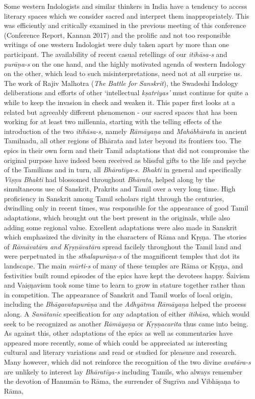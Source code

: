 Some western Indologists and similar thinkers in India have a tendency to access literary spaces which we consider sacred and interpret them inappropriately. This was efficiently and critically examined in the previous meeting of this conference (Conference Report, Kannan 2017) and the prolific and not too responsible writings of one western Indologist were duly taken apart by more than one participant. The availability of recent casual retellings of our \textit{itihāsa-s} and \textit{purāņa-s} on the one hand, and the highly motivated agenda of western Indology on the other, which lead to such misinterpretations, need not at all surprise us. The work of Rajiv Malhotra (\textit{The Battle for Sanskrit}), the Swadeshi Indology deliberations and efforts of other ‘intellectual \textit{kṣatriyas’} must continue for quite a while to keep the invasion in check and weaken it. This paper first looks at a related but agreeably different phenomenon - our sacred spaces that has been working for at least two millennia, starting with the telling effects of the introduction of the two \textit{itihāsa-s,} namely \textit{Rāmāyaṇa} and \textit{Mahābhārata} in ancient Tamilnadu, all other regions of Bhārata and later beyond its frontiers too. The epics in their own form and their Tamil adaptations that did not compromise the original purpose have indeed been received as blissful gifts to the life and psyche of the Tamilians and in turn, all \textit{Bhāratīya-s. Bhakti} in general and specifically \textit{Viṣṇu Bhakti} had blossomed throughout \textit{Bhārata}, helped along by the simultaneous use of Sanskrit, Prakrits and Tamil over a very long time. High proficiency in Sanskrit among Tamil scholars right through the centuries, dwindling only in recent times, was responsible for the appearance of good Tamil adaptations, which brought out the best present in the originals, while also adding some regional value. Excellent adaptations were also made in Sanskrit which emphasized the divinity in the characters of Rāma and Kṛṣṇa. The stories of \textit{Rāmāvatāra and Kṛṣṇāvatāra} spread facilely throughout the Tamil land and were perpetuated in the \textit{sthalapurāṇa-s} of the magnificent temples that dot its landscape. The main \textit{mūrti-s} of many of these temples are Rāma or Kṛṣṇa, and festivities built round episodes of the epics have kept the devotees happy. Śaivism and Vaiṣṇavism took some time to learn to grow in stature together rather than in competition. The appearance of Sanskrit and Tamil works of local origin, including the \textit{Bhāgavatapurāṇa} and the \textit{Adhyātma Rāmāyaņa} helped the process along. A \textit{Sanātanic} specification for any adaptation of either \textit{itihāsa}, which would seek to be recognized as another \textit{Rāmāyaṇa} or \textit{Kṛṣṇacarita} thus came into being. As against this, other adaptations of the epics as well as commentaries have appeared more recently, some of which could be appreciated as interesting cultural and literary variations and read or studied for pleasure and research. Many however, which did not reinforce the recognition of the two divine \textit{avatāra-s} are unlikely to interest lay \textit{Bhāratīya-s} including Tamils, who always remember the devotion of Hanumān to Rāma, the surrender of Sugrīva and Vibhīṣaņa to Rāma, 